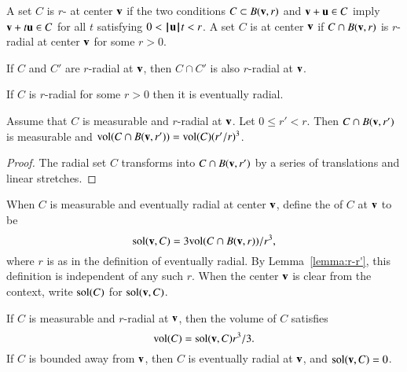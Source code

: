 \begin{definition}[radial]
  A set $C$ is $r$- at center ${\mathbf v}$ if the two
  conditions $C\subset B({\mathbf v},r)$ and ${\mathbf v} + {\mathbf u} \in C$ imply ${\mathbf v} + t {\mathbf u}
  \in C$ for all $t$ satisfying $0 < {{\hskip0.1em|\hskip-0.15em|\hskip0.1em}{\mathbf u}{\hskip0.1em|\hskip-0.15em|\hskip0.1em}} t < r$.  A set $C$ is
   at center ${\mathbf v}$ if $C\cap B({\mathbf v},r)$ is
  $r$-radial at center ${\mathbf v}$ for some $r>0$.  %
\end{definition}
%


\begin{lemma}  If $C$ and $C'$ are  $r$-radial
at ${\mathbf v}$, then $C\cap C'$ is also $r$-radial at
${\mathbf v}$.
\end{lemma}

\begin{lemma}
If $C$ is $r$-radial for some $r>0$ then it is eventually radial.
\end{lemma}

\begin{lemma}\label{lemma:r-r'}
Assume that $C$ is measurable and $r$-radial at ${\mathbf v}$.  Let $0\le
r'<r$.   Then $C\cap B({\mathbf v},r')$ is measurable and ${\operatorname{vol}}(C\cap
B({\mathbf v},r')) = {\operatorname{vol}}(C) (r'/r)^3$.
\end{lemma}

\begin{proof}  The radial set $C$ transforms into $C\cap B({\mathbf v},r')$ by
a series of translations and linear stretches.
\end{proof}


\begin{definition}\label{def:sol}
When $C$ is measurable and eventually radial at center ${\mathbf v}$, 
define the  of $C$ at ${\mathbf v}$ to be
\[ 
\operatorname{sol}({\mathbf v},C) = 3 {\operatorname{vol}}(C\cap B({\mathbf v},r))/r^3,
\] 
where $r$ is as in the definition of eventually radial. 
By Lemma~\ref{lemma:r-r'}, this
definition is independent of any such $r$.  When the center ${\mathbf v}$ is
clear from the context, write $\operatorname{sol}(C)$ for
$\operatorname{sol}({\mathbf v},C)$.
%
%
\end{definition}


\begin{lemma}
If $C$ is measurable and $r$-radial at ${\mathbf v}$, then the volume of $C$
satisfies
\[ 
{\operatorname{vol}}(C) = \operatorname{sol}({\mathbf v},C) r^3/3.
\] 
If $C$ is bounded away from ${\mathbf v}$, then $C$ is eventually radial at
${\mathbf v}$, and $\operatorname{sol}({\mathbf v},C) = 0$.
%
\end{lemma}


